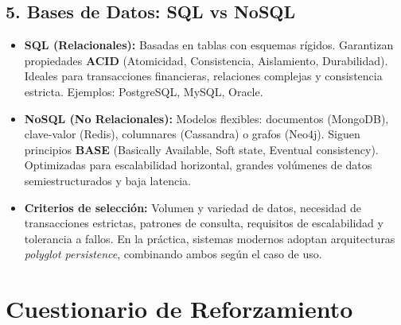 \documentclass[12pt,a4paper]{article}
\begin{document}
\subsection*{5. Bases de Datos: SQL vs NoSQL}
\begin{itemize}
    \item \textbf{SQL (Relacionales):} Basadas en tablas con esquemas rígidos. Garantizan propiedades \textbf{ACID} (Atomicidad, Consistencia, Aislamiento, Durabilidad). Ideales para transacciones financieras, relaciones complejas y consistencia estricta. Ejemplos: PostgreSQL, MySQL, Oracle.
    \item \textbf{NoSQL (No Relacionales):} Modelos flexibles: documentos (MongoDB), clave-valor (Redis), columnares (Cassandra) o grafos (Neo4j). Siguen principios \textbf{BASE} (Basically Available, Soft state, Eventual consistency). Optimizadas para escalabilidad horizontal, grandes volúmenes de datos semiestructurados y baja latencia.
    \item \textbf{Criterios de selección:} Volumen y variedad de datos, necesidad de transacciones estrictas, patrones de consulta, requisitos de escalabilidad y tolerancia a fallos. En la práctica, sistemas modernos adoptan arquitecturas \textit{polyglot persistence}, combinando ambos según el caso de uso.
\end{itemize}

\section*{Cuestionario de Reforzamiento}
\end{document}
